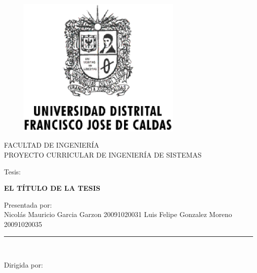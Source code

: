 \documentclass[letter,openright,12pt]{book}
\begin{document}
  \begin{titlepage}

    \begin{center}
      \vspace*{-1in}
      \begin{figure}[htb]
    \begin{center}
      \includegraphics[width=8cm]{imagenes/Logo_Distrital.eps}
    \end{center}
    \end{figure}

    FACULTAD DE INGENIERÍA\\
    \vspace*{0.15in}
    PROYECTO CURRICULAR DE INGENIERÍA DE SISTEMAS \\
    \vspace*{0.6in}
    \begin{large}
    Tesis:\\
    \end{large}
    \vspace*{0.2in}
    \begin{Large}
    \textbf{EL TÍTULO DE LA TESIS} \\
    \end{Large}
    \vspace*{0.3in}
    \begin{large}
    Presentada por:\\
      Nicolás Mauricio Garcia Garzon 20091020031
      Luis Felipe Gonzalez Moreno 20091020035
    \end{large}
    \vspace*{0.3in}
    \rule{80mm}{0.1mm}\\
    \vspace*{0.1in}
    \begin{large}
    Dirigida por: \\
    \end{large}
    \end{center}

    \end{titlepage}
\end{document}

